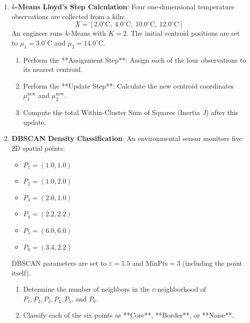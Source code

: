 \begin{checkyourself}
\begin{enumerate}
    \item \textbf{$k$-Means Lloyd's Step Calculation}:
    Four one-dimensional temperature observations are collected from a kiln:
    \begin{equation*}
    X = [2.0^\circ\text{C}, \ 4.0^\circ\text{C}, \ 10.0^\circ\text{C}, \ 12.0^\circ\text{C}]
    \end{equation*}
    An engineer runs $k$-Means with $K = 2$. The initial centroid positions are set to $\mu_1 = 3.0^\circ\text{C}$ and $\mu_2 = 14.0^\circ\text{C}$.
    \begin{enumerate}[label=(\alph*)]
        \item Perform the **Assignment Step**: Assign each of the four observations to its nearest centroid.
        \item Perform the **Update Step**: Calculate the new centroid coordinates $\mu_1^{\text{new}}$ and $\mu_2^{\text{new}}$.
        \item Compute the total Within-Cluster Sum of Squares (Inertia $J$) after this update.
    \end{enumerate}

    \item \textbf{DBSCAN Density Classification}:
    An environmental sensor monitors five 2D spatial points:
    \begin{itemize}
        \item $P_1 = (1.0, 1.0)$
        \item $P_2 = (1.0, 2.0)$
        \item $P_3 = (2.0, 1.0)$
        \item $P_4 = (2.2, 2.2)$
        \item $P_5 = (6.0, 6.0)$
        \item $P_6 = (3.4, 2.2)$
    \end{itemize}
    DBSCAN parameters are set to $\varepsilon = 1.5$ and $\text{MinPts} = 3$ (including the point itself).
    \begin{enumerate}[label=(\alph*)]
        \item Determine the number of neighbors in the $\varepsilon$-neighborhood of $P_1, P_2, P_3, P_4, P_5$, and $P_6$.
        \item Classify each of the six points as **Core**, **Border**, or **Noise**.
    \end{enumerate}


\end{enumerate}
\end{checkyourself}
